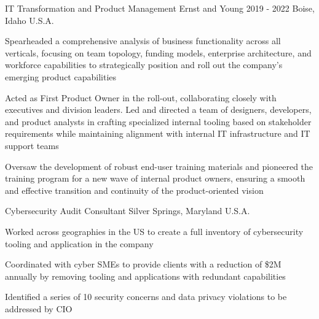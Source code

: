 \begin{cventries}
  \cventry
    {IT Transformation and Product Management} %
    {Ernst and Young} %
    {2019 - 2022} %
    {Boise, Idaho U.S.A.} %
    {
      \begin{cvitems} %
        \item {Spearheaded a comprehensive analysis of business functionality across all verticals, focusing on team topology, funding models, enterprise architecture, and workforce capabilities to strategically position and roll out the company’s emerging product capabilities}
        \item {Acted as First Product Owner in the roll-out, collaborating closely with executives and division leaders. Led and directed a team of designers, developers, and product analysts in crafting specialized internal tooling based on stakeholder requirements while maintaining alignment with internal IT infrastructure and IT support teams}
        \item {Oversaw the development of robust end-user training materials and pioneered the training program for a new wave of internal product owners, ensuring a smooth and effective transition and continuity of the product-oriented vision}
      \end{cvitems}
    }

  \cventry
    {Cybersecurity Audit Consultant} %
    {} %
    {} %
    {Silver Springs, Maryland U.S.A.} %
    {
      \begin{cvitems} %
        \item {Worked across geographies in the US to create a full inventory of cybersecurity tooling and application in the company}
        \item {Coordinated with cyber SMEs to provide clients with a reduction of \$2M annually by removing tooling and applications with redundant capabilities}
        \item {Identified a series of 10 security concerns and data privacy violations to be addressed by CIO}
      \end{cvitems}
    }


\end{cventries}
